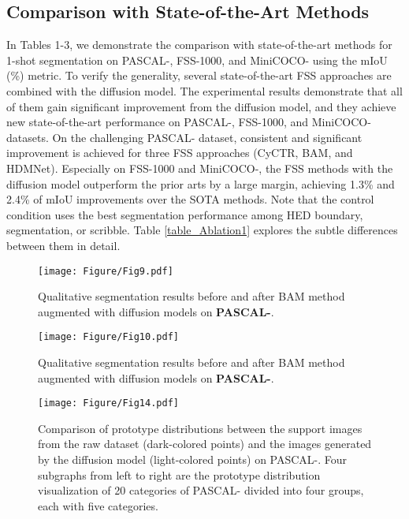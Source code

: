 \documentclass[sigconf]{acmart}
\begin{document}
\subsection{Comparison with State-of-the-Art Methods}
In Tables 1-3, we demonstrate the comparison with state-of-the-art methods for 1-shot segmentation on PASCAL-, FSS-1000, and MiniCOCO- using the mIoU (\%) metric. To verify the generality, several state-of-the-art FSS approaches are combined with the diffusion model. The experimental results demonstrate that all of them gain significant improvement from the diffusion model, and they achieve new state-of-the-art performance on PASCAL-, FSS-1000, and MiniCOCO- datasets. On the challenging PASCAL- dataset, consistent and significant improvement is achieved for three FSS approaches (CyCTR, BAM, and HDMNet). Especially on FSS-1000 and MiniCOCO-, the FSS methods with the diffusion model outperform the prior arts by a large margin, achieving 1.3\% and 2.4\% of mIoU improvements over the SOTA methods. Note that the control condition uses the best segmentation performance among HED boundary, segmentation, or scribble. Table \ref{table_Ablation1} explores the subtle differences between them in detail.



\begin{figure*}[t]
    \texttt{[image: Figure/Fig9.pdf]}
    \caption{Qualitative segmentation results before and after BAM method \cite{BAM2022} augmented with diffusion models on \textbf{PASCAL-}.}
    \label{Fig9_label}
\end{figure*}



\begin{figure*}[t]
    \texttt{[image: Figure/Fig10.pdf]}
    \caption{Qualitative segmentation results before and after BAM method \cite{BAM2022} augmented with diffusion models on \textbf{PASCAL-}.}
    \label{Fig10_label}
\end{figure*}



\begin{figure*}[t]
    \texttt{[image: Figure/Fig14.pdf]}
    \caption{Comparison of prototype distributions between the support images from the raw dataset (dark-colored points) and the images generated by the diffusion model (light-colored points) on PASCAL-. Four subgraphs from left to right are the prototype distribution visualization of 20 categories of PASCAL- divided into four groups, each with five categories.}
    \label{Fig14_label}
\end{figure*}
\end{document}
